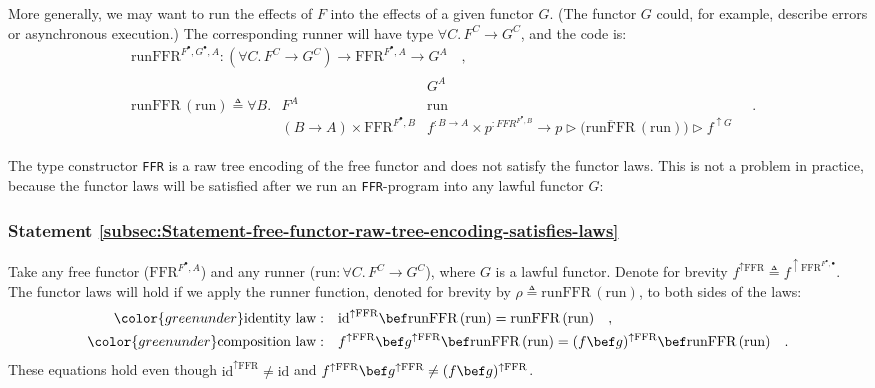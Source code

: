 More generally, we may want to run the effects of $F$ into the effects
of a given functor $G$. (The functor $G$ could, for example, describe
errors or asynchronous execution.) The corresponding runner will have
type $\forall C.\,F^{C}\rightarrow G^{C}$, and the code is: 
\begin{align*}
 & \text{runFFR}^{F^{\bullet},G^{\bullet},A}:(\forall C.\,F^{C}\rightarrow G^{C})\rightarrow\text{FFR}^{F^{\bullet},A}\rightarrow G^{A}\quad,\\
 & \text{runFFR}\,(\text{run})\triangleq\forall B.\,\,\begin{array}{|c||c|}
 & G^{A}\\
\hline F^{A} & \text{run}\\
(B\rightarrow A)\times\text{FFR}^{F^{\bullet},B} & f^{:B\rightarrow A}\times p^{:FFR^{F^{\bullet},B}}\rightarrow p\triangleright\big(\overline{\text{runFFR}}\,(\text{run})\big)\triangleright f^{\uparrow G}
\end{array}\quad.
\end{align*}

The type constructor \lstinline!FFR!
is a raw tree encoding of the
free functor and does not satisfy the functor laws. This is not a
problem in practice, because the functor laws will be satisfied after
we run an \lstinline!FFR!-program
into any lawful functor $G$:

\subsubsection{Statement \label{subsec:Statement-free-functor-raw-tree-encoding-satisfies-laws}\ref{subsec:Statement-free-functor-raw-tree-encoding-satisfies-laws}}

Take any free functor ($\text{FFR}^{F^{\bullet},A}$) and any runner
($\text{run}:\forall C.\,F^{C}\rightarrow G^{C}$), where $G$ is
a lawful functor. Denote for brevity $f^{\uparrow\text{FFR}}\triangleq f^{\uparrow\text{FFR}^{F^{\bullet},\bullet}}$.
The functor laws will hold if we apply the runner function, denoted
for brevity by $\rho\triangleq\text{runFFR}\,(\text{run})$, to both
sides of the laws:
\begin{align*}
{\color{greenunder}\text{identity law}:}\quad & \text{id}^{\uparrow\text{FFR}}\bef\text{runFFR}\,(\text{run})=\text{runFFR}\,(\text{run})\quad,\\
{\color{greenunder}\text{composition law}:}\quad & f^{\uparrow\text{FFR}}\bef g^{\uparrow\text{FFR}}\bef\text{runFFR}\,(\text{run})=(f\bef g)^{\uparrow\text{FFR}}\bef\text{runFFR}\,(\text{run})\quad.
\end{align*}
These equations hold even though $\text{id}^{\uparrow\text{FFR}}\neq\text{id}$
and $f^{\uparrow\text{FFR}}\bef g^{\uparrow\text{FFR}}\neq(f\bef g)^{\uparrow\text{FFR}}$.

